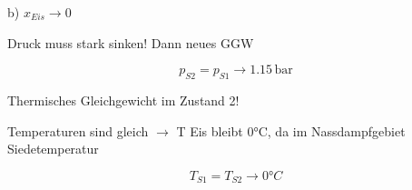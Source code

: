 b) $x_{Eis} \rightarrow 0$

Druck muss stark sinken! Dann neues GGW

\[
p_{S2} = p_{S1} \rightarrow 1.15 \, \text{bar}
\]

Thermisches Gleichgewicht im Zustand 2!

Temperaturen sind gleich $\rightarrow$ T Eis bleibt 0°C, da im Nassdampfgebiet Siedetemperatur

\[
T_{S1} = T_{S2} \rightarrow 0°C
\]